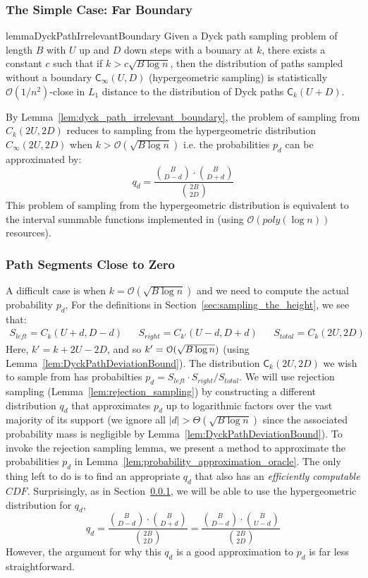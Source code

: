 \subsubsection{The Simple Case: Far Boundary}%
\label{sec:the_simple_case}
\begin{restatable}{lemma}{DyckPathIrrelevantBoundary}
\label{lem:dyck_path_irrelevant_boundary}
Given a Dyck path sampling problem of length $B$ with $U$ up and $D$ down steps with a bounary at $k$,
there exists a constant $c$ such that if $k > c \sqrt{B\log n}$, then the distribution of paths sampled without a boundary $\mathsf C_{\infty}(U,D)$
(hypergeometric sampling) is statistically $\mathcal O(1/n^2)$-close in $L_1$ distance to the distribution of Dyck paths $\mathsf C_k(U+D)$.
\end{restatable}
By Lemma~\ref{lem:dyck_path_irrelevant_boundary}, the problem of sampling from $C_k(2U,2D)$
reduces to sampling from the hypergeometric distribution $C_{\infty}(2U,2D)$ when $k>\mathcal{O}(\sqrt{B\log n})$
i.e. the probabilities $p_d$ can be approximated by:
\[
q_d = \frac{{{B}\choose{D-d}}\cdot{{B}\choose{D+d}}}{{{2B}\choose{2D}}}
\]
This problem of sampling from the hypergeometric distribution is equivalent to the interval summable functions
implemented in \cite{huge} (using $\mathcal O(poly(\log n))$ resources).

\subsubsection{Path Segments Close to Zero}
\label{sec:path_segments_close_to_zero}
A difficult case is when $k = \mathcal{O}(\sqrt{B\log n})$ and we need to compute the actual probability $p_d$,
For the definitions in Section~\ref{sec:sampling_the_height}, we see that:
\begin{align}
    S_{left} = C_k(U+d,D-d)
    &&S_{right} = C_{k'}(U-d,D+d)
    &&S_{total} = C_k(2U,2D)
\end{align}
Here, $k' = k+2U-2D$, and so $k' = \Bo(\sqrt{B\log n})$ (using Lemma~\ref{lem:DyckPathDeviationBound}).
The distribution $\mathsf C_k(2U,2D)$ we wish to sample from has probabilties $p_d = S_{left}\cdot S_{right}/S_{total}$.
We will use rejection sampling (Lemma~\ref{lem:rejection_sampling}) by constructing a different distribution $q_d$
that approximates $p_d$ up to logarithmic factors over the vast majority of its support
(we ignore all $|d|>\Theta(\sqrt{B\log n})$ since the associated probability mass is negligible by Lemma~\ref{lem:DyckPathDeviationBound}).
To invoke the rejection sampling lemma, we present a method to approximate the probabilities $p_d$ in Lemma~\ref{lem:probability_approximation_oracle}.
The only thing left to do is to find an appropriate $q_d$ that also has an \emph{efficiently computable} $CDF$.
Surprisingly, as in Section~\ref{sec:the_simple_case}, we will be able to use the hypergeometric distribution for $q_d$,
\[
q_d = \frac{{B\choose D-d}\cdot{B\choose D+d}}{{2B\choose 2D}} = \frac{{B\choose D-d}\cdot{B\choose U-d}}{{2B\choose 2D}}
\]
However, the argument for why this $q_d$ is a good approximation to $p_d$ is far less straightforward.


